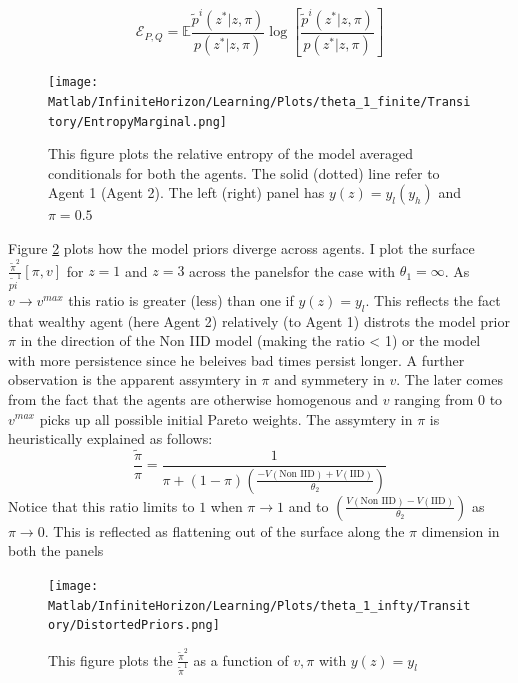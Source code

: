 \documentclass[12pt]{article}
\begin{document}
{\[\mathcal{E}_{P,Q} =  \mathbb{E} \frac{\tilde{p}^i(z^*|z,\pi)}{p(z^*|z,\pi)} \log\left[\frac{\tilde{p}^i(z^*|z,\pi)}{p(z^*|z,\pi)}\right]\]}
\begin{figure}[htbp]
\centering
	  \texttt{[image: Matlab/InfiniteHorizon/Learning/Plots/theta\_1\_finite/Transitory/EntropyMarginal.png]}

	\caption{\small{This figure plots the relative entropy of the model averaged
 conditionals for both the agents. The solid (dotted) line refer to Agent 1 (Agent 2). The left (right) panel has $y(z)=y_l (y_h)$ and $\pi=0.5$ }}
 
	\label{fig:EntropyMarginal}
\end{figure} 

\noindent Figure \ref{fig:DistPriors} plots how the model priors diverge across agents. I plot the surface $\frac{\tilde{\pi}^2}{\tilde{pi}^1}[\pi,v]$ for $z=1$ and $z=3$ across the panelsfor the case with $\theta_1=\infty$.  As $v\to v^{max}$ this ratio is greater (less) than one if $y(z)=y_l$. This reflects the fact that wealthy agent (here Agent 2) relatively (to Agent 1) distrots the model prior $\pi$ in the direction of the Non IID model (making the ratio < 1) or the model with more persistence since he beleives bad times persist longer. A further observation is the apparent assymtery in $\pi$ and symmetery in $v$. The later comes from the fact that the agents are otherwise homogenous and $v$ ranging from $0$ to $v^{max}$ picks up all possible initial Pareto weights. The assymtery in $\pi$ is heuristically explained as follows:
\[\frac{\tilde{\pi} }{\pi} = \frac{1}{\pi+(1-\pi) \left(\frac{-V(\text{Non IID}) + V(\text{IID})}{\theta_2}\right)}\]
Notice that this ratio limits to $1$ when $\pi \to 1$ and to $\left(\frac{V(\text{Non IID}) - V(\text{IID})}{\theta_2}\right)$ as $\pi \to 0$. This is reflected as flattening out of the surface along the $\pi$ dimension in both the panels
\begin{figure}[htbp]
\centering
	  \texttt{[image: Matlab/InfiniteHorizon/Learning/Plots/theta\_1\_infty/Transitory/DistortedPriors.png]}

	\caption{This figure plots the $\frac{\tilde{\pi}^2}{\tilde{\pi}^1}$ as a function of $v,\pi$ with  $y(z)=y_l $ }
 
	\label{fig:DistPriors}
\end{figure} 
\end{document}
